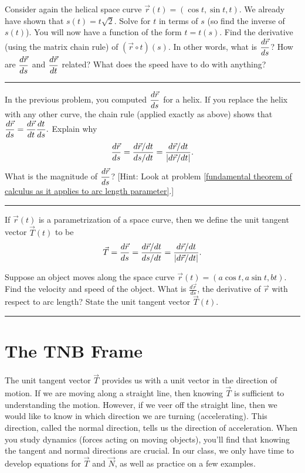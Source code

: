 \begin{problem}
 Consider again the helical space curve $\vec r(t)=(\cos t, \sin t, t)$.  We already have shown that $s(t) = t\sqrt{2}$. Solve for $t$ in terms of $s$ (so find the inverse of $s(t)$). You will now have a function of the form $t=t(s)$.  Find the derivative (using the matrix chain rule) of $(\vec r\circ t)(s)$. In other words, what is $\displaystyle\frac{d\vec r}{ds}$? How are $\displaystyle\frac{d\vec r}{ds}$  and $\displaystyle\frac{d\vec r}{dt}$ related?  What does the speed have to do with anything?
\hrule\end{problem}

\begin{problem}
In the previous problem, you computed $\displaystyle\frac{d\vec r}{ds}$ for a helix. If you replace the helix with any other curve, the chain rule (applied exactly as above) shows that $\displaystyle\frac{d\vec r}{ds} = \frac{d\vec r}{dt}\frac{dt}{ds}.$
Explain why $$\displaystyle\frac{d\vec r}{ds} =\displaystyle\frac{d\vec r/dt}{ds/dt} = \frac{d\vec r/dt}{|d\vec r/dt|}.$$
What is the magnitude of $\displaystyle\frac{d\vec r}{ds}$? 
[Hint: Look at problem \ref{fundamental theorem of calculus as it applies to arc length parameter}.] 
\hrule\end{problem}


\begin{definition}
 If $\vec r(t)$ is a parametrization of a space curve, then we define the unit tangent vector $\vec T(t)$ to be 
$$\vec T = \displaystyle\frac{d\vec r}{ds}=\displaystyle\frac{d\vec r/dt}{ds/dt} = \frac{d\vec r/dt}{|d \vec r/dt|}.$$
\end{definition}

\begin{problem}
 Suppose an object moves along the space curve $\vec r(t)=(a\cos t,a\sin t,b t)$. Find the velocity and speed of the object. What is $\frac{d\vec r}{ds}$, the derivative of $\vec r$ with respect to arc length?  State the unit tangent vector $\vec T(t)$.
\hrule\end{problem}

\section{The TNB Frame}
The unit tangent vector $\vec T$ provides us with a unit vector in the direction of motion. If we are moving along a straight line, then knowing $\vec T$ is sufficient to understanding the motion.  However, if we veer off the straight line, then we would like to know in which direction we are turning (accelerating).  This direction, called the normal direction, tells us the direction of acceleration. When you study dynamics (forces acting on moving objects), you'll find that knowing the tangent and normal directions are crucial. In our class, we only have time to develop equations for $\vec T$ and $\vec N$, as well as practice on a few examples. 

